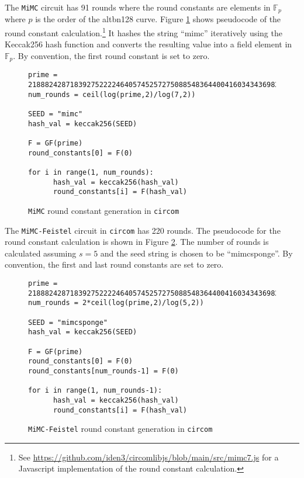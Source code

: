 \documentclass[10pt]{article}
\begin{document}
The \texttt{MiMC} circuit has 91 rounds where the round constants are elements in $\mathbb{F}_p$ where $p$ is the order of the alt\textunderscore bn128 curve. Figure \ref{fig:MiMCconstantscircom} shows pseudocode of the round constant calculation.\footnote{See \url{https://github.com/iden3/circomlibjs/blob/main/src/mimc7.js} for a Javascript implementation of the round constant calculation.} It hashes the string ``mimc'' iteratively using the Keccak256 hash function and converts the resulting value into a field element in $\mathbb{F}_p$. By convention, the first round constant is set to zero.
\begin{figure}[t]
\begin{verbatim}
prime = 21888242871839275222246405745257275088548364400416034343698204186575808495617
num_rounds = ceil(log(prime,2)/log(7,2))

SEED = "mimc"
hash_val = keccak256(SEED)

F = GF(prime)
round_constants[0] = F(0)

for i in range(1, num_rounds):
      hash_val = keccak256(hash_val)
      round_constants[i] = F(hash_val)
\end{verbatim}
\caption{\texttt{MiMC} round constant generation in \texttt{circom}}%
\label{fig:MiMCconstantscircom}
\end{figure}

The \texttt{MiMC-Feistel} circuit in \texttt{circom} has 220 rounds. The pseudocode for the round constant calculation is shown in Figure \ref{fig:MiMCFeistelconstantscircom}. The number of rounds is calculated assuming $s=5$ and the seed string is chosen to be ``mimcsponge''. By convention, the first and last round constants are set to zero.

\begin{figure}[t]
\begin{verbatim}
prime = 21888242871839275222246405745257275088548364400416034343698204186575808495617
num_rounds = 2*ceil(log(prime,2)/log(5,2))

SEED = "mimcsponge"
hash_val = keccak256(SEED)

F = GF(prime)
round_constants[0] = F(0)
round_constants[num_rounds-1] = F(0)

for i in range(1, num_rounds-1):
      hash_val = keccak256(hash_val)
      round_constants[i] = F(hash_val)
\end{verbatim}
\caption{\texttt{MiMC-Feistel} round constant generation in \texttt{circom}}%
\label{fig:MiMCFeistelconstantscircom}
\end{figure}
\end{document}
